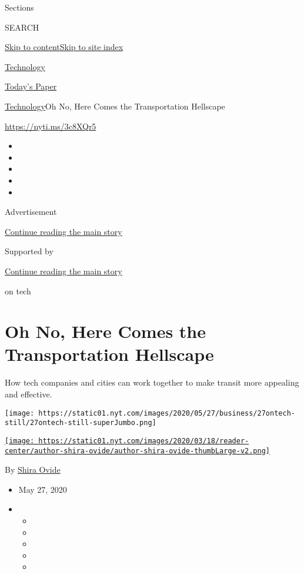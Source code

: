 Sections

SEARCH

\protect\hyperlink{site-content}{Skip to
content}\protect\hyperlink{site-index}{Skip to site index}

\href{https://www.nytimes.com/section/technology}{Technology}

\href{https://myaccount.nytimes.com/auth/login?response_type=cookie\&client_id=vi}{}

\href{https://www.nytimes.com/section/todayspaper}{Today's Paper}

\href{/section/technology}{Technology}\textbar{}Oh No, Here Comes the
Transportation Hellscape

\url{https://nyti.ms/3c8XQr5}

\begin{itemize}
\item
\item
\item
\item
\item
\end{itemize}

Advertisement

\protect\hyperlink{after-top}{Continue reading the main story}

Supported by

\protect\hyperlink{after-sponsor}{Continue reading the main story}

on tech

\hypertarget{oh-no-here-comes-the-transportation-hellscape}{%
\section{Oh No, Here Comes the Transportation
Hellscape}\label{oh-no-here-comes-the-transportation-hellscape}}

How tech companies and cities can work together to make transit more
appealing and effective.

\texttt{[image: https://static01.nyt.com/images/2020/05/27/business/27ontech-still/27ontech-still-superJumbo.png]}

\href{https://www.nytimes.com/by/shira-ovide}{\texttt{[image: https://static01.nyt.com/images/2020/03/18/reader-center/author-shira-ovide/author-shira-ovide-thumbLarge-v2.png]}}

By \href{https://www.nytimes.com/by/shira-ovide}{Shira Ovide}

\begin{itemize}
\item
  May 27, 2020
\item
  \begin{itemize}
  \item
  \item
  \item
  \item
  \item
  \end{itemize}
\end{itemize}

